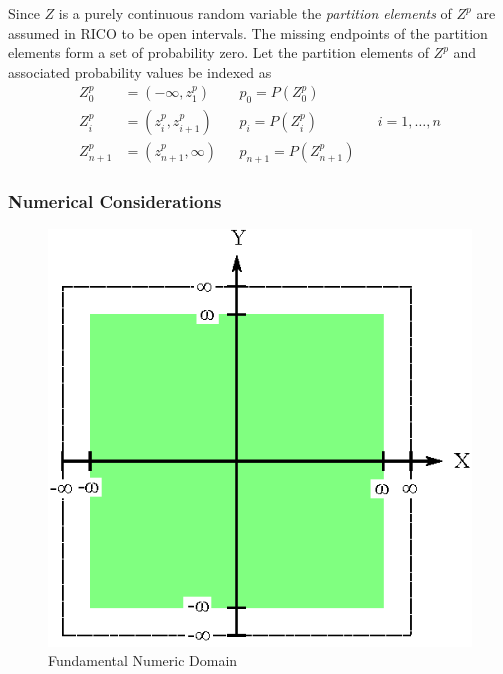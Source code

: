 Since $Z$ is a purely continuous random variable the \emph{partition elements} of $Z^p$ are assumed in RICO to be open intervals. The missing endpoints of the partition elements form a set of probability zero. Let the partition elements of $Z^p$ and associated probability values be indexed as
\begin{align*}
Z_0^p &= (-\infty, z_1^p) && p_0 = P(Z_0^p)\\
Z_i^p &= (z_i^p, z_{i+1}^p) && p_i = P(Z_i^p) && i = 1, \dots, n\\
Z_{n+1}^p &= (z_{n+1}^p, \infty) && p_{n+1} = P(Z_{n+1}^p)
\end{align*}

\subsubsection{Numerical Considerations}

\begin{figure}
  \centering
  \includegraphics{Images/Quadrants.eps}
  \caption[Fundamental Numeric Domain]
          {Fundamental Numeric Domain}
  \label{fig:Quadrants}
\end{figure}

